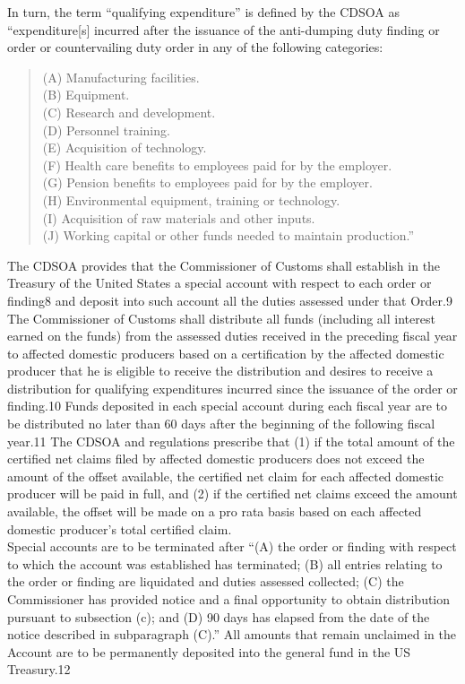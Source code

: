 \begin{tcolorbox}[breakable]
 \quad In turn, the term “qualifying expenditure” is defined by the CDSOA as “expenditure[s]
incurred after the issuance of the anti-dumping duty finding or order or countervailing duty order in
any of the following categories:
\blockquote{
(A) Manufacturing facilities.\\
(B) Equipment.\\
(C) Research and development.\\
(D) Personnel training.\\
(E) Acquisition of technology.\\
(F) Health care benefits to employees paid for by the employer.\\
(G) Pension benefits to employees paid for by the employer.\\
(H) Environmental equipment, training or technology.\\
(I) Acquisition of raw materials and other inputs.\\
(J) Working capital or other funds needed to maintain production.”
}

 \quad The CDSOA provides that the Commissioner of Customs shall establish in the Treasury of
the United States a special account with respect to each order or finding8
 and deposit into such
account all the duties assessed under that Order.9
 The Commissioner of Customs shall distribute all
funds (including all interest earned on the funds) from the assessed duties received in the preceding
fiscal year to affected domestic producers based on a certification by the affected domestic producer
that he is eligible to receive the distribution and desires to receive a distribution for qualifying
expenditures incurred since the issuance of the order or finding.10 Funds deposited in each special
account during each fiscal year are to be distributed no later than 60 days after the beginning of the
following fiscal year.11 The CDSOA and regulations prescribe that (1) if the total amount of the
certified net claims filed by affected domestic producers does not exceed the amount of the offset
available, the certified net claim for each affected domestic producer will be paid in full, and (2) if the
certified net claims exceed the amount available, the offset will be made on a pro rata basis based on
each affected domestic producer’s total certified claim.\\

 \quad Special accounts are to be terminated after “(A) the order or finding with respect to which the
account was established has terminated; (B) all entries relating to the order or finding are liquidated
and duties assessed collected; (C) the Commissioner has provided notice and a final opportunity to
obtain distribution pursuant to subsection (c); and (D) 90 days has elapsed from the date of the notice
described in subparagraph (C).” All amounts that remain unclaimed in the Account are to be
permanently deposited into the general fund in the US Treasury.12\\


\end{tcolorbox}
